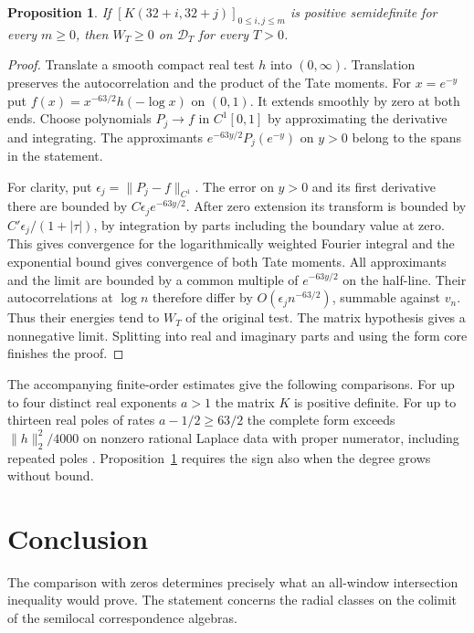 \documentclass[11pt]{amsart}
\newtheorem{proposition}[theorem]{Proposition}
\theoremstyle{definition}
\theoremstyle{remark}
\begin{document}
\begin{proposition}\label{ladder}
If $[K(32+i,32+j)]_{0\le i,j\le m}$ is positive semidefinite for every
$m\ge0$, then $W_T\ge0$ on $\mathcal D_T$ for every $T>0$.
\end{proposition}
\begin{proof}
Translate a smooth compact real test $h$ into $(0,\infty)$. Translation
preserves the autocorrelation and the product of the Tate moments. For
$x=e^{-y}$ put $f(x)=x^{-63/2}h(-\log x)$ on $(0,1)$. It extends smoothly
by zero at both ends. Choose polynomials $P_j\to f$ in $C^1[0,1]$ by
approximating the derivative and integrating. The approximants
$e^{-63y/2}P_j(e^{-y})$ on $y>0$ belong to the spans in the statement.

For clarity, put $\epsilon_j=\|P_j-f\|_{C^1}$. The error on $y>0$ and its
first derivative there are bounded by $C\epsilon_j e^{-63y/2}$.
After zero extension its transform is bounded by
$C'\epsilon_j/(1+|\tau|)$, by integration by parts including the boundary
value at zero. This gives convergence for the logarithmically weighted
Fourier integral and the exponential bound gives convergence of both Tate
moments. All approximants and the limit are bounded by a common multiple
of $e^{-63y/2}$ on the half-line. Their autocorrelations at $\log n$
therefore differ by $O(\epsilon_j n^{-63/2})$, summable against $v_n$.
Thus their energies tend to $W_T$ of the original test. The matrix
hypothesis gives a nonnegative limit. Splitting into real and imaginary
parts and using the form core finishes the proof.
\end{proof}

The accompanying finite-order estimates give the following comparisons. For up to four distinct real exponents $a>1$ the matrix $K$ is positive
definite. For up to thirteen real poles of rates
$a-1/2\ge63/2$ the complete form exceeds $\|h\|_2^2/4000$ on nonzero
rational Laplace data with proper numerator, including repeated poles
. Proposition~\ref{ladder} requires the sign also
when the degree grows without bound.

\clearpage
\section{Conclusion}
The comparison with zeros determines precisely what an all-window
intersection inequality would prove. The statement concerns the radial
classes on the colimit of the semilocal correspondence algebras.
\end{document}
